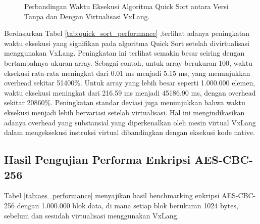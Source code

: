 \begin{figure}[htbp]
    \centering
    \caption{Perbandingan Waktu Eksekusi Algoritma Quick Sort antara Versi Tanpa dan Dengan Virtualisasi VxLang.}
    \label{fig:quick_sort_performance}
\end{figure}

Berdasarkan Tabel \ref{tab:quick_sort_performance} ,terlihat adanya peningkatan waktu eksekusi yang signifikan pada algoritma Quick Sort setelah divirtualisasi menggunakan VxLang. Peningkatan ini terlihat semakin besar seiring dengan bertambahnya ukuran array. Sebagai contoh, untuk array berukuran 100, waktu eksekusi rata-rata meningkat dari 0.01 ms menjadi 5.15 ms, yang menunjukkan overhead sekitar 51400\%. Untuk array yang lebih besar seperti 1.000.000 elemen, waktu eksekusi meningkat dari 216.59 ms menjadi 45186.90 ms, dengan overhead sekitar 20860\%. Peningkatan standar deviasi juga menunjukkan bahwa waktu eksekusi menjadi lebih bervariasi setelah virtualisasi. Hal ini mengindikasikan adanya overhead yang substansial yang diperkenalkan oleh mesin virtual VxLang dalam mengeksekusi instruksi virtual dibandingkan dengan eksekusi kode native.

\subsection{Hasil Pengujian Performa Enkripsi AES-CBC-256}
Tabel \ref{tab:aes_performance} menyajikan hasil benchmarking enkripsi AES-CBC-256 dengan 1.000.000 blok data, di mana setiap blok berukuran 1024 bytes, sebelum dan sesudah virtualisasi menggunakan VxLang.

